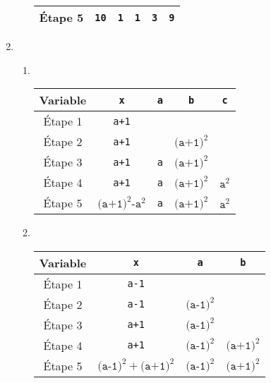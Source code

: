 \begin{correction}
\begin{enumerate}
\begin{enumerate}
\begin{center}
\begin{tabular}{|c|c|c|c|c|c|}
			Étape 5 &\texttt{10}&\texttt{1}&\texttt{1}&\texttt{3}&\texttt{9}\\\hline
		\end{tabular}\end{center}
	\end{enumerate}
	\item \begin{enumerate}
		\item ~\begin{center}
		\begin{tabular}{|c|c|c|c|c|}
				\hline
				Variable &\texttt{x}&\texttt{a}&\texttt{b}&\texttt{c} \\\hline
				Étape 1 &\texttt{a+1}&&&\\\hline
				Étape 2 &\texttt{a+1}&&$\texttt{(a+1)}^2$&\\\hline
				Étape 3 &\texttt{a+1}&\texttt{a}&$\texttt{(a+1)}^2$&\\\hline
				Étape 4 &\texttt{a+1}&\texttt{a}&$\texttt{(a+1)}^2$&$\texttt{a}^2$\\\hline
				Étape 5 &$\texttt{(a+1)}^2\texttt{-a}^2$&\texttt{a}&$\texttt{(a+1)}^2$&$\texttt{a}^2$\\\hline
			\end{tabular}\end{center}
		\item~\begin{center}
			\begin{tabular}{|c|c|c|c|}
				\hline
				Variable &\texttt{x}&\texttt{a}&\texttt{b} \\\hline
				Étape 1 &\texttt{a-1}&&\\\hline
				Étape 2 &\texttt{a-1}&$\texttt{(a-1)}^2$&\\\hline
				Étape 3 &\texttt{a+1}&$\texttt{(a-1)}^2$&\\\hline
				Étape 4 &\texttt{a+1}&$\texttt{(a-1)}^2$&$\texttt{(a+1)}^2$\\\hline
				Étape 5 &$\texttt{(a-1)}^2+\texttt{(a+1)}^2$&$\texttt{(a-1)}^2$&$\texttt{(a+1)}^2$\\\hline
		\end{tabular}\end{center}
	

\end{enumerate}
\end{enumerate}
\end{correction}
